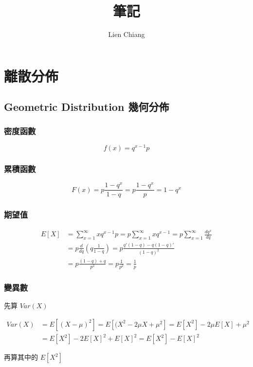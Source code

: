 \documentclass{article}
\title{筆記}
\author{Lien Chiang}
\date{}
\begin{document}
\maketitle

\section{離散分佈}

\bigskip
\subsection{Geometric Distribution 幾何分佈}

\bigskip
\subsubsection{密度函數}
\[ f(x)=q^{x-1}p \]

\subsubsection{累積函數}
\[ F(x)=p\frac{1-q^x}{1-q}
       =p\frac{1-q^x}{p}=
        1-q^x \]

\subsubsection{期望值}
\begin{align*}
E[X]
& =  \sum_{x=1}^\infty{xq^{x-1}p}
  = p\sum_{x=1}^\infty{xq^{x-1}}
  = p\sum_{x=1}^\infty{\frac{dq^x}{dq}} \\
& = p\frac{d}{dq}(q\frac{1}{1-q})
  = p\frac{q'(1-q)-q(1-q)'}{(1-q)^2} \\
& = p\frac{(1-q)+q}{p^2}
  = p\frac{1}{p^2}
  =  \frac{1}{p}
\end{align*}

\clearpage

\subsubsection{變異數}

\bigskip
先算 \( Var(X) \)

\begin{align*}
Var(X)
& = E[(X-\mu)^2]
  = E[(X^2-2\mu X+\mu^2]
  = E[X^2]-2\mu E[X]+\mu^2 \\
& = E[X^2]-2E[X]^2+E[X]^2
  = E[X^2]-E[X]^2
\end{align*}

\bigskip
再算其中的 \( E[X^2] \)
\end{document}
